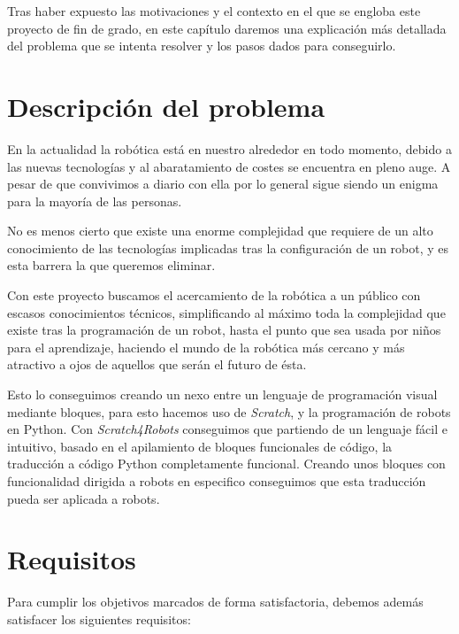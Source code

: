 Tras haber expuesto las motivaciones y el contexto en el que se engloba este proyecto de fin de grado, en este capítulo daremos una explicación más detallada del problema que se
intenta resolver y los pasos dados para conseguirlo.


\section{Descripción del problema}
\label{sec:descripcion del problema}

En la actualidad la robótica está en nuestro alrededor en todo momento, debido a las nuevas tecnologías y al abaratamiento de costes se encuentra en pleno auge. A pesar de que convivimos a diario con ella por lo general sigue siendo un enigma para la mayoría de las personas.

No es menos cierto que existe una enorme complejidad que requiere de un alto conocimiento de las tecnologías implicadas tras la configuración de un robot, y es esta barrera la que queremos eliminar.

Con este proyecto buscamos el acercamiento de la robótica a un público con escasos conocimientos técnicos, simplificando al máximo toda la complejidad que existe tras la programación de un robot, hasta el punto que sea usada por niños para el aprendizaje, haciendo el mundo de la robótica más cercano y más atractivo a ojos de aquellos que serán el futuro de ésta.

Esto lo conseguimos creando un nexo entre un lenguaje de programación visual mediante bloques, para esto hacemos uso de \textit{Scratch}, y la programación de robots en Python. Con \textit{Scratch4Robots} conseguimos que partiendo de un lenguaje fácil e intuitivo, basado en el apilamiento de bloques funcionales de código, la traducción a código Python completamente funcional. Creando unos bloques con funcionalidad dirigida a robots en especifico conseguimos que esta traducción pueda ser aplicada a robots.    

\section{Requisitos}
\label{sec:requisitos}

Para cumplir los objetivos marcados de forma satisfactoria, debemos además satisfacer
los siguientes requisitos:

